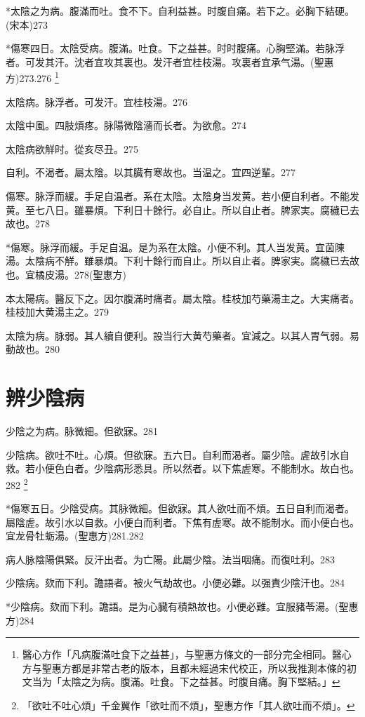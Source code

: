 \documentclass[12pt,twoside,UTF8,b5paper]{ctexbook}
\begin{document}
*太陰之为病。腹滿而吐。食不下。自利益甚。时腹自痛。若下之。必胸下結硬。(宋本)273

*傷寒四日。太陰受病。腹滿。吐食。下之益甚。时时腹痛。心胸堅滿。若脉浮者。可发其汗。沈者宜攻其裏也。发汗者宜桂枝湯。攻裏者宜承气湯。(聖惠方)273.276
	\footnote{醫心方作「凡病腹滿吐食下之益甚」，与聖惠方條文的一部分完全相同。醫心方与聖惠方都是非常古老的版本，且都未經過宋代校正，所以我推測本條的初文当为「太陰之为病。腹滿。吐食。下之益甚。时腹自痛。胸下堅結。」}

太陰病。脉浮者。可发汗。宜桂枝湯。276

太陰中風。四肢煩疼。{脉}陽微陰濇而长者。为欲愈。274

太陰病欲觧时。從亥尽丑。275

自利。不渴者。屬太陰。以其臓有寒故也。当温之。宜四逆輩。277

傷寒。脉浮而緩。手足自温者。系在太陰。太陰{身}当发黄。若小便自利者。不能发黄。至七八日。雖暴煩。下利日十餘行。必自止。所以自止者。脾家実。腐穢已去故也。278

*傷寒。脉浮而緩。手足自温。是为系在太陰。小便不利。其人当发黄。宜茵陳湯。太陰病不觧。雖暴煩。下利十餘行而自止。所以自止者。脾家実。腐穢已去故也。宜橘皮湯。278(聖惠方)

{本}太陽病。醫反下之。因尔腹滿时痛者。屬太陰。桂枝加芍藥湯主之。大実痛者。桂枝加大黄湯主之。279

太陰为病。脉弱。其人續自便利。設当行大黄芍藥者。宜減之。以其人胃气弱。易動故也。280

\chapter{辨少陰病}

少陰之为病。脉微細。但欲寐。281

少陰病。欲吐不吐。心煩。但欲寐。五六日。自利而渴者。屬少陰。虗故引水自救。若小便色白者。少陰病形悉具。所以然者。以下焦虗寒。不能制水。故白也。282
	\footnote{「欲吐不吐心煩」千金翼作「欲吐而不煩」，聖惠方作「其人欲吐而不煩」。}

*傷寒五日。少陰受病。其脉微細。但欲寐。其人欲吐而不煩。五日自利而渴者。屬陰虗。故引水以自救。小便白而利者。下焦有虗寒。故不能制水。而小便白也。宜龙骨牡蛎湯。(聖惠方)281.282

病人脉陰陽俱緊。反汗出者。为亡陽。此屬少陰。法当咽痛。而復吐利。283

少陰病。欬而下利。譫語者。被火气劫故也。小便必難。以强責少陰汗也。284

*少陰病。欬而下利。譫語。是为心臓有積熱故也。小便必難。宜服豬苓湯。(聖惠方)284
\end{document}
